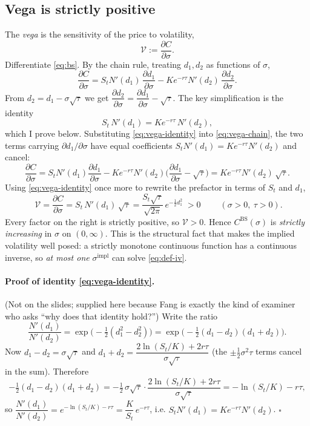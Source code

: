 \documentclass[11pt]{article}
\newcommand{\impl}{\mathrm{impl}}
\newcommand{\BS}{\mathrm{BS}}
\newcommand{\Vega}{\mathcal{V}}
\begin{document}
\subsection{Vega is strictly positive}

The \emph{vega} is the sensitivity of the price to volatility,
\[
\Vega:=\frac{\partial C}{\partial\sigma}.
\]
Differentiate \eqref{eq:bs}. By the chain rule, treating $d_1,d_2$ as functions of $\sigma$,
\begin{equation}\label{eq:vega-chain}
\frac{\partial C}{\partial\sigma}
= S_t N'(d_1)\,\frac{\partial d_1}{\partial\sigma}
 - Ke^{-r\tau}N'(d_2)\,\frac{\partial d_2}{\partial\sigma}.
\end{equation}
From $d_2=d_1-\sigma\sqrt{\tau}$ we get $\dfrac{\partial d_2}{\partial\sigma}
=\dfrac{\partial d_1}{\partial\sigma}-\sqrt{\tau}$. The key simplification is the identity
\begin{equation}\label{eq:vega-identity}
S_t\,N'(d_1)=Ke^{-r\tau}\,N'(d_2),
\end{equation}
which I prove below. Substituting \eqref{eq:vega-identity} into \eqref{eq:vega-chain}, the two
terms carrying $\partial d_1/\partial\sigma$ have equal coefficients $S_tN'(d_1)=Ke^{-r\tau}N'(d_2)$
and cancel:
\[
\frac{\partial C}{\partial\sigma}
= S_tN'(d_1)\frac{\partial d_1}{\partial\sigma}
 - Ke^{-r\tau}N'(d_2)\Big(\frac{\partial d_1}{\partial\sigma}-\sqrt{\tau}\Big)
= Ke^{-r\tau}N'(d_2)\,\sqrt{\tau}.
\]
Using \eqref{eq:vega-identity} once more to rewrite the prefactor in terms of $S_t$ and $d_1$,
\begin{equation}\label{eq:vega}
\boxed{\;\Vega=\frac{\partial C}{\partial\sigma}=S_t\,N'(d_1)\,\sqrt{\tau}
=\frac{S_t\sqrt{\tau}}{\sqrt{2\pi}}\,e^{-\frac12 d_1^2}\;>0\;}
\qquad(\sigma>0,\ \tau>0).
\end{equation}
Every factor on the right is strictly positive, so $\Vega>0$. Hence $C^{\BS}(\sigma)$ is
\emph{strictly increasing} in $\sigma$ on $(0,\infty)$. This is the structural fact that makes the
implied volatility well posed: a strictly monotone continuous function has a continuous inverse,
so \emph{at most one} $\sigma^{\impl}$ can solve \eqref{eq:def-iv}.

\paragraph{Proof of identity \eqref{eq:vega-identity}.} (Not on the slides; supplied here because
Fang is exactly the kind of examiner who asks ``why does that identity hold?'') Write the ratio
\[
\frac{N'(d_1)}{N'(d_2)}=\exp\!\Big(-\tfrac12(d_1^2-d_2^2)\Big)
=\exp\!\Big(-\tfrac12(d_1-d_2)(d_1+d_2)\Big).
\]
Now $d_1-d_2=\sigma\sqrt{\tau}$ and $d_1+d_2=\dfrac{2\ln(S_t/K)+2r\tau}{\sigma\sqrt{\tau}}$
(the $\pm\tfrac12\sigma^2\tau$ terms cancel in the sum). Therefore
\[
-\tfrac12(d_1-d_2)(d_1+d_2)
=-\tfrac12\,\sigma\sqrt{\tau}\cdot\frac{2\ln(S_t/K)+2r\tau}{\sigma\sqrt{\tau}}
=-\ln(S_t/K)-r\tau,
\]
so $\dfrac{N'(d_1)}{N'(d_2)}=e^{-\ln(S_t/K)-r\tau}=\dfrac{K}{S_t}\,e^{-r\tau}$, i.e.
$S_tN'(d_1)=Ke^{-r\tau}N'(d_2)$. \hfill$\square$
\end{document}
